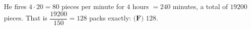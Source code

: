 He fires $4\cdot20=80$ pieces per minute for $4$ hours $=240$ minutes, a total of $19200$ pieces. That is $\dfrac{19200}{150}=128$ packs exactly: $\boxed{\textbf{(F) }128}$.
